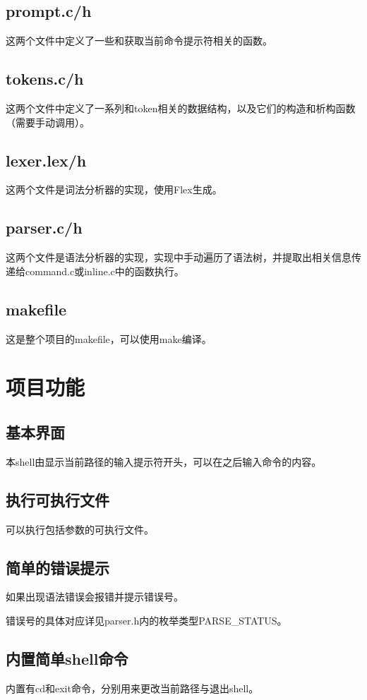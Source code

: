 \documentclass{article}
\begin{document}
\subsection{prompt.c/h}
这两个文件中定义了一些和获取当前命令提示符相关的函数。

\subsection{tokens.c/h}
这两个文件中定义了一系列和token相关的数据结构，以及它们的构造和析构函数（需要手动调用）。

\subsection{lexer.lex/h}
这两个文件是词法分析器的实现，使用Flex生成。

\subsection{parser.c/h}
这两个文件是语法分析器的实现，实现中手动遍历了语法树，并提取出相关信息传递给command.c或inline.c中的函数执行。

\subsection{makefile}
这是整个项目的makefile，可以使用make编译。

\section{项目功能}

\subsection{基本界面}
本shell由显示当前路径的输入提示符开头，可以在之后输入命令的内容。

\subsection{执行可执行文件}
可以执行包括参数的可执行文件。

\subsection{简单的错误提示}
如果出现语法错误会报错并提示错误号。

错误号的具体对应详见parser.h内的枚举类型PARSE\_STATUS。

\subsection{内置简单shell命令}
内置有cd和exit命令，分别用来更改当前路径与退出shell。
\end{document}
